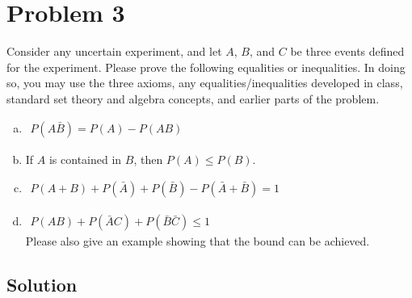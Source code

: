 \section{Problem 3}
Consider any uncertain experiment, and let $A$, $B$, and $C$ be three events defined for the experiment. Please prove the following equalities or inequalities. In doing so, you may use the three axioms, any equalities/inequalities developed in class, standard set theory and algebra concepts, and earlier parts of the problem.

\begin{enumerate}[a.]
	\item
	\!  %
	$
	\begin{aligned}
		P(A\bar B) = P(A) -  P(AB) \nonumber
	\end{aligned}
	$
	\item 
	\! If $A$ is contained in $B$, then $P(A) \leq P(B)$.
	\item  
	\! 
	$
		\begin{aligned}
			P(A+B) + P(\bar A) + P(\bar B) - P(\bar A + \bar B) = 1 \nonumber
		\end{aligned}
	$ 
	\item
	\!  
	$
		\begin{aligned}
			P(AB) + P(\bar A C) + P(\bar B \bar C) \leq 1 \nonumber
		\end{aligned}
	$ \\[5pt]
	Please also give an example showing that the bound can be achieved.
\end{enumerate}

\subsection{Solution}

